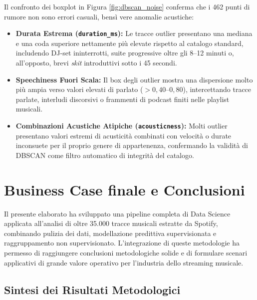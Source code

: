 \documentclass[12pt,a4paper]{article}
\begin{document}
Il confronto dei boxplot in Figura \ref{fig:dbscan_noise} conferma che i 462 punti di rumore non sono errori casuali, bensì vere anomalie acustiche:
\begin{itemize}
    \item \textbf{Durata Estrema (\texttt{duration\_ms}):} Le tracce outlier presentano una mediana e una coda superiore nettamente più elevate rispetto al catalogo standard, includendo DJ-set ininterrotti, suite progressive oltre gli 8--12 minuti o, all'opposto, brevi \textit{skit} introduttivi sotto i 45 secondi.
    \item \textbf{Speechiness Fuori Scala:} Il box degli outlier mostra una dispersione molto più ampia verso valori elevati di parlato ($> 0,40\text{--}0,80$), intercettando tracce parlate, interludi discorsivi o frammenti di podcast finiti nelle playlist musicali.
    \item \textbf{Combinazioni Acustiche Atipiche (\texttt{acousticness}):} Molti outlier presentano valori estremi di acusticità combinati con velocità o durate inconsuete per il proprio genere di appartenenza, confermando la validità di DBSCAN come filtro automatico di integrità del catalogo.
\end{itemize}

\newpage
\section{Business Case finale e Conclusioni}

Il presente elaborato ha sviluppato una pipeline completa di Data Science applicata all'analisi di oltre 35.000 tracce musicali estratte da Spotify, combinando pulizia dei dati, modellazione predittiva supervisionata e raggruppamento non supervisionato. L'integrazione di queste metodologie ha permesso di raggiungere conclusioni metodologiche solide e di formulare scenari applicativi di grande valore operativo per l'industria dello streaming musicale.

\subsection{Sintesi dei Risultati Metodologici}
\end{document}
